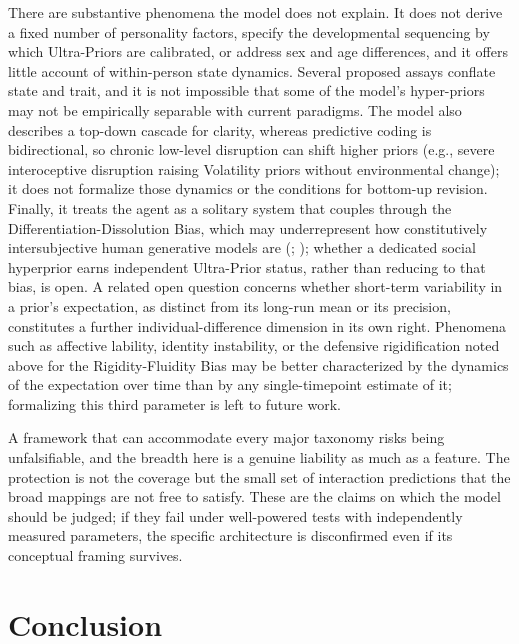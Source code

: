 \documentclass[
  jou,
  floatsintext,
  longtable,
  nolmodern,
  notxfonts,
  notimes,
  12pt,
  colorlinks=true,linkcolor=blue,citecolor=blue,urlcolor=blue]{apa7}
\begin{document}
There are substantive phenomena the model does not explain. It does not
derive a fixed number of personality factors, specify the developmental
sequencing by which Ultra-Priors are calibrated, or address sex and age
differences, and it offers little account of within-person state
dynamics. Several proposed assays conflate state and trait, and it is
not impossible that some of the model's hyper-priors may not be
empirically separable with current paradigms. The model also describes a
top-down cascade for clarity, whereas predictive coding is
bidirectional, so chronic low-level disruption can shift higher priors
(e.g., severe interoceptive disruption raising Volatility priors without
environmental change); it does not formalize those dynamics or the
conditions for bottom-up revision. Finally, it treats the agent as a
solitary system that couples through the Differentiation-Dissolution
Bias, which may underrepresent how constitutively intersubjective human
generative models are (; ); whether a dedicated social hyperprior earns independent
Ultra-Prior status, rather than reducing to that bias, is open. A
related open question concerns whether short-term variability in a
prior's expectation, as distinct from its long-run mean or its
precision, constitutes a further individual-difference dimension in its
own right. Phenomena such as affective lability, identity instability,
or the defensive rigidification noted above for the Rigidity-Fluidity
Bias may be better characterized by the dynamics of the expectation over
time than by any single-timepoint estimate of it; formalizing this third
parameter is left to future work.

A framework that can accommodate every major taxonomy risks being
unfalsifiable, and the breadth here is a genuine liability as much as a
feature. The protection is not the coverage but the small set of
interaction predictions that the broad mappings are not free to satisfy.
These are the claims on which the model should be judged; if they fail
under well-powered tests with independently measured parameters, the
specific architecture is disconfirmed even if its conceptual framing
survives.

\section{Conclusion}\label{conclusion}
\end{document}

